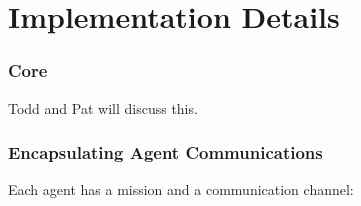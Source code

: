 \documentclass{beamer}
\begin{document}
\section{Implementation Details}

\begin{frame}
  \frametitle{Core}

  Todd and Pat will discuss this.

\end{frame}


\begin{frame}
  \frametitle{Encapsulating Agent Communications}

  Each agent has a mission and a communication channel:


\end{frame}
\end{document}

